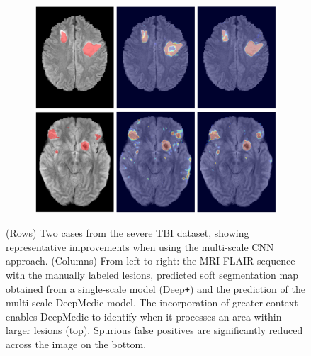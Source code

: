 \begin{figure}[!h]
\centering
\begin{subfigure}[b]{0.85\textwidth}
\centering
	\includegraphics[clip=true, trim=0pt 0pt 0pt 0pt, width=1.0\textwidth]{figures/validationOfArchitecture/multiscale/qualitativeComparisonMultiscale/figureNew/multiscaleQual.png}
\end{subfigure}

\caption{(Rows) Two cases from the severe TBI dataset, showing representative improvements when using the multi-scale CNN approach. (Columns) From left to right: the MRI FLAIR sequence with the manually labeled lesions, predicted soft segmentation map obtained from a single-scale model (Deep\texttt{+}) and the prediction of the multi-scale DeepMedic model. The incorporation of greater context enables DeepMedic to identify when it processes an area within larger lesions (top). Spurious false positives are significantly reduced across the image on the bottom.}
\label{fig:qualitativeMultiscaleVal}
\end{figure}
